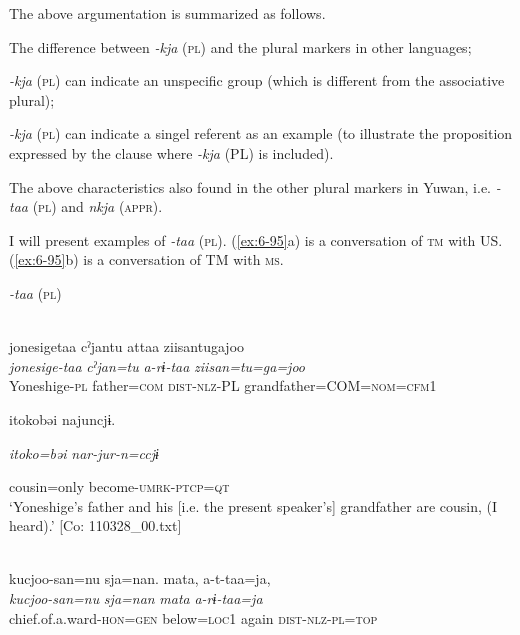 \begin{table}
The above argumentation is summarized as follows.

\ea\label{ex:6-94}
  The difference between \textit{-kja} (\textsc{pl}) and the plural markers in other languages;

 \ea \textit{-kja} (\textsc{pl}) can indicate an unspecific group (which is different from the associative plural);\\
\gll

\ex \textit{-kja} (\textsc{pl}) can indicate a singel referent as an example (to illustrate the proposition expressed by the clause where \textit{-kja} (PL) is included).\\
\gll

The above characteristics also found in the other plural markers in Yuwan, i.e. \textit{-taa} (\textsc{pl}) and \textit{nkja} (\textsc{appr}).

I will present examples of \textit{-taa} (\textsc{pl}). (\ref{ex:6-95}a) is a conversation of \textsc{tm} with US. (\ref{ex:6-95}b) is a conversation of TM with \textsc{ms}.

\ea\label{ex:6-95}
  \textit{-taa} (\textsc{pl})

 \ea{}\\
{\TM}
\glll  jonesigetaa  cˀjantu  attaa  ziisantugajoo\\
\textit{jonesige-taa}  \textit{cˀjan=tu}  \textit{a-rɨ-taa}  \textit{ziisan=tu=ga=joo}\\
Yoneshige-\textsc{pl}  father=\textsc{com}  \textsc{dist}-\textsc{nlz}-PL  grandfather=COM=\textsc{nom}=\textsc{cfm}1

      {\textbar}itoko{\textbar}bəi  najuncjɨ.

      \textit{itoko=bəi}  \textit{nar-jur-n=ccjɨ}

      cousin=only  become-\textsc{umrk}-\textsc{ptcp}=\textsc{qt}\\
\glt ‘Yoneshige’s father and his [i.e. the present speaker’s] grandfather are cousin, (I heard).’ [Co: 110328\_00.txt]
\z

\ex{}\\
{\TM}
\glll  kucjoo-san=nu  sja=nan.  mata,  a-t-taa=ja,\\
\textit{kucjoo-san=nu}  \textit{sja=nan}  \textit{mata}  \textit{a-rɨ-taa=ja}\\
chief.of.a.ward-\textsc{hon}=\textsc{gen}  below=\textsc{loc}1  again  \textsc{dist}-\textsc{nlz}-\textsc{pl}=\textsc{top}


\end{table}
